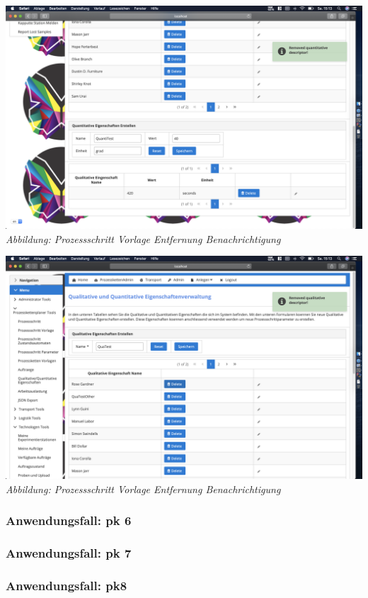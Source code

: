 \documentclass[enabledeprecatedfontcommands,fontsize=12pt,paper=a4,twoside]{scrartcl}
\begin{document}
\hypertarget{sc3.3.3.7}{
\includegraphics[width=1\textwidth]{Screenshots/336RemoveMeldungqt.png}
\textit{Abbildung: Prozessschritt Vorlage Entfernung Benachrichtigung}
}  
\hypertarget{sc3.3.3.7}{
\includegraphics[width=1\textwidth]{Screenshots/336RemoveMledungql.png}
\textit{Abbildung: Prozessschritt Vorlage Entfernung Benachrichtigung}
}  
\subsubsection{Anwendungsfall: pk 6}


\subsubsection{Anwendungsfall: pk 7}


\subsubsection{Anwendungsfall: pk8 }
\end{document}
